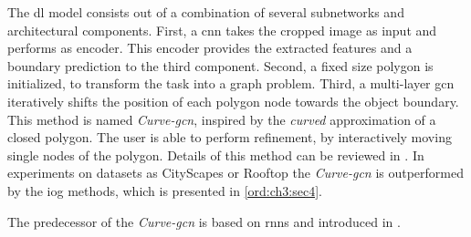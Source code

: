 The \gls{dl} model consists out of a combination of several subnetworks and architectural components.
First, a \gls{cnn} takes the cropped image as input and performs as encoder.
This encoder provides the extracted features and a boundary prediction to the third component.
Second, a fixed size polygon is initialized, to transform the task into a graph problem.
Third, a multi-layer \gls{gcn} iteratively shifts the position of each polygon node towards the object boundary. 
This method is named \textit{Curve-\gls{gcn}}, inspired by the \textit{curved} approximation of a closed polygon.
The user is able to perform refinement, by interactively moving single nodes of the polygon.
Details of this method can be reviewed in \cite{Ling19-Curve-GCN}.
In experiments on datasets as CityScapes or Rooftop the \textit{Curve-\gls{gcn}} is outperformed by the \gls{iog} methods, which is presented in \ref{ord:ch3:sec4}.

The predecessor of the \textit{Curve-\gls{gcn}} is based on \glspl{rnn} and introduced in \cite{Acu18-Polygon-RNN++}.





